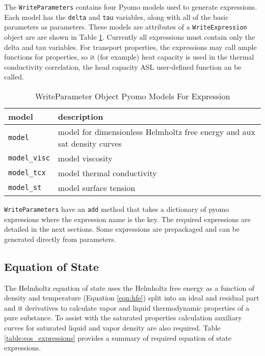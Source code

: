 \documentclass[oneside]{book}
\begin{document}
The \texttt{WriteParameters} contains four Pyomo models used to generate expressions.  Each model has the \texttt{delta} and \texttt{tau} variables, along with all of the basic parameters as parameters.  These models are attributes of a \texttt{WriteExpression} object are are shown in Table \ref{table:pyomo_models}. Currently all expressions must contain only the delta and tau variables.  For transport properties, the expressions may call ample functions for properties, so it (for example) heat capacity is used in the thermal conductivity correlation, the head capacity ASL user-defined function an be called. 

\begin{table}[h!]
\centering
\caption{WriteParameter Object Pyomo Models For Expression}
\begin{tabular}{ l l }
\hline
model & description  \\
\hline
\hline
\texttt{model} & model for dimensionless Helmholtz free energy and aux sat density curves  \\[1ex]
\texttt{model\_visc} & model viscosity  \\[1ex]
\texttt{model\_tcx} & model thermal conductivity  \\[1ex]
\texttt{model\_st} & model surface tension \\[1ex]
 \hline    
\end{tabular}
\label{table:pyomo_models}
\end{table}

\texttt{WriteParameters} have an \texttt{add} method that takes a dictionary of pyomo expressions where the expression name is the key.  The required expressions are detailed in the next sections.  Some expressions are prepackaged and can be generated directly from parameters.


\subsection{Equation of State}

The Helmholtz equation of state uses the Helmholtz free energy as a function of density and temperature (Equation \ref{eqn:hfe}) split into an ideal and residual part and it derivatives to calculate vapor and liquid thermodynamic properties of a pure substance. To assist with the saturated properties calculation auxiliary curves for saturated liquid and vapor density are also required.  Table \ref{table:eos_expressions} provides a summary of required equation of state expressions.  
\end{document}
